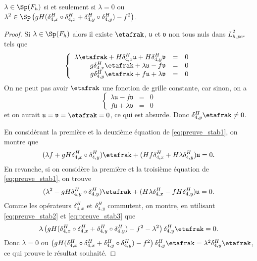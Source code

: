 \begin{proposition}
$\lambda \in \Sp(F_h)$ si et seulement si $\lambda = 0$ ou $\lambda^2 \in \Sp \left( gH (\delta_{4,x}^H \circ \delta_{4,x}^H + \delta_{4,y}^H \circ \delta_{4,y}^H) - f^2 \right)$.
\label{prop:spectre_F_h}
\end{proposition}

\begin{proof}
Si $\lambda \in \Sp(F_h)$ alors il existe $\etafrak$, $\mathfrak{u}$ et $\mathfrak{v}$ non tous nuls dans $L^2_{h,per}$ tels que
\begin{equation}
\left\lbrace
\begin{array}{rcl}
\lambda \etafrak + H \delta_{4,x}^H \mathfrak{u} + H \delta_{4,y}^H \mathfrak{v} & = & 0 \\
g \delta_{4,x}^H \etafrak + \lambda \mathfrak{u} - f \mathfrak{v} & = & 0 \\
g \delta_{4,y}^H \etafrak + f \mathfrak{u} + \lambda \mathfrak{v} & = & 0
\end{array}
\right.
\label{eq:preuve_stab1}
\end{equation}
On ne peut pas avoir $\etafrak$ une fonction de grille constante, car sinon, on a 
\begin{equation}
\left\lbrace
\begin{array}{rcl}
\lambda \mathfrak{u} - f \mathfrak{v} & = & 0 \\
f \mathfrak{u} + \lambda \mathfrak{v} & = & 0
\end{array}
\right.
\end{equation}
et on aurait $\mathfrak{u} = \mathfrak{v} = \etafrak = 0$, ce qui est absurde. Donc $\delta_{4,y}^H \etafrak \neq 0$.

En considérant la première et la deuxième équation de \eqref{eq:preuve_stab1}, on montre que 
\begin{equation}
(\lambda f + gH \delta_{4,x}^H \circ \delta_{4,y}^H) \etafrak + (Hf \delta_{4,x}^H + H \lambda \delta_{4,y}^H) \mathfrak{u} = 0.
\label{eq:preuve_stab2}
\end{equation}
En revanche, si on considère la première et la troisième équation de \eqref{eq:preuve_stab1}, on trouve
\begin{equation}
(\lambda^2 - gH \delta_{4,y}^H \circ \delta_{4,y}^H) \etafrak + (H \lambda \delta_{4,x}^H - f H \delta_{4,y}^H) \mathfrak{u} = 0.
\label{eq:preuve_stab3}
\end{equation}
Comme les opérateurs $\delta_{4,x}^H$ et $\delta_{4,y}^H$ commutent, on montre, en utilisant \eqref{eq:preuve_stab2} et \eqref{eq:preuve_stab3} que
\begin{equation}
\lambda \left( gH (\delta_{4,x}^H \circ \delta_{4,x}^H + \delta_{4,y}^H \circ \delta_{4,y}^H) - f^2 - \lambda^2 \right) \delta_{4,y}^H \etafrak = 0.
\end{equation}
Donc $\lambda = 0$ ou $\left( gH (\delta_{4,x}^H \circ \delta_{4,x}^H + \delta_{4,y}^H \circ \delta_{4,y}^H) - f^2\right) \delta_{4,y}^H \etafrak = \lambda^2 \delta_{4,y}^H \etafrak$,
ce qui prouve le résultat souhaité.
\end{proof}

